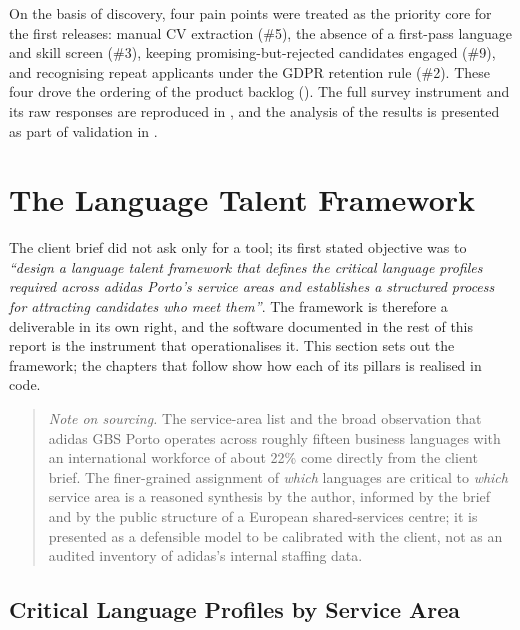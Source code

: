 On the basis of discovery, four pain points were treated as the priority
core for the first releases: manual CV extraction (\#5), the absence of a
first-pass language and skill screen (\#3), keeping promising-but-rejected
candidates engaged (\#9), and recognising repeat applicants under the GDPR
retention rule (\#2). These four drove the ordering of the product backlog
(). The full survey instrument and its raw
responses are reproduced in , and the analysis of
the results is presented as part of validation in
.


\section{The Language Talent Framework}
\label{sec:analysis-framework}

The client brief did not ask only for a tool; its first stated objective was
to \emph{``design a language talent framework that defines the critical
language profiles required across adidas Porto's service areas and
establishes a structured process for attracting candidates who meet them''}.
The framework is therefore a deliverable in its own right, and the software
documented in the rest of this report is the instrument that operationalises
it. This section sets out the framework; the chapters that follow show how
each of its pillars is realised in code.

\begin{quote}
\emph{Note on sourcing.} The service-area list and the broad observation that
adidas GBS Porto operates across roughly fifteen business languages with an
international workforce of about 22\% come directly from the client brief.
The finer-grained assignment of \emph{which} languages are critical to
\emph{which} service area is a reasoned synthesis by the author, informed by
the brief and by the public structure of a European shared-services centre;
it is presented as a defensible model to be calibrated with the client, not
as an audited inventory of adidas's internal staffing data.
\end{quote}

\subsection{Critical Language Profiles by Service Area}
\label{sec:framework-profiles}


